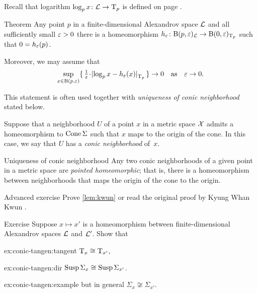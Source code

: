 Recall that logarithm $\log_px\colon\mathcal{L}\to \mathrm{T}_p$ is defined on page \pageref{page:log}.

\begin{thm}{Theorem}\label{thm:spherical-nbhd}
Any point $p$ in a finite-dimensional Alexandrov space $\mathcal{L}$
and all sufficiently small $\varepsilon>0$
there is a homeomorphism $h_\varepsilon\colon\mathrm{B}{}(p,\varepsilon)_{\mathcal{L}}\to \mathrm{B}{}(0,\varepsilon)_{\mathrm{T}_p}$ such that $0=h_\varepsilon(p)$.

Moreover, we may assume that 
\[
\sup_{x\in \oBall(p,\eps)}\{\,\tfrac1\eps\cdot\dist{\log_px}{h_\eps(x)}{\T_p}\,\}\to 0
\quad\text{as}\quad
\eps\to 0.\]
\end{thm}

This statement is often used together with \textit{uniqueness of conic neighborhood} stated below.

Suppose that a neighborhood $U$ of a point $x$ in a metric space $\mathcal{X}$
admits a homeomorphism to $\mathop{\rm Cone}\nolimits\Sigma$ such that $x$ maps to the origin of the cone.
In this case, we say that $U$ has a \emph{conic neighborhood} of~$x$.

\begin{thm}{Uniqueness of conic neighborhood}\label{lem:kwun}
Any two conic neighborhoods of a given point in a metric space are \emph{pointed homeomorphic}; that is, there is a homeomorphism between neighborhoods that maps the origin of the cone to the origin.
\end{thm}

\begin{thm}{Advanced exercise}\label{ex:conic}
Prove \ref{lem:kwun} or read the original proof by Kyung Whan Kwun \cite{kwun1964}.
\end{thm}


\begin{thm}{Exercise}\label{ex:conic-tangent}
Suppose $x\mapsto x'$ is a homeomorphism between finite-dimensional Alexandrov spaces $\mathcal{L}$ and $\mathcal{L}'$. Show that 

\begin{subthm}{ex:conic-tangen:tangent}
$\mathrm{T}_x\cong \mathrm{T}_{x'}$,
\end{subthm}

\begin{subthm}{ex:conic-tangen:dir}
$\mathop{\rm Susp}\nolimits\Sigma_x\cong \mathop{\rm Susp}\nolimits\Sigma_{x'}$.
\end{subthm}

\begin{subthm}{ex:conic-tangen:example}
but in general $\Sigma_x\not\cong\Sigma_{x'}$.
\end{subthm}

\end{thm}



